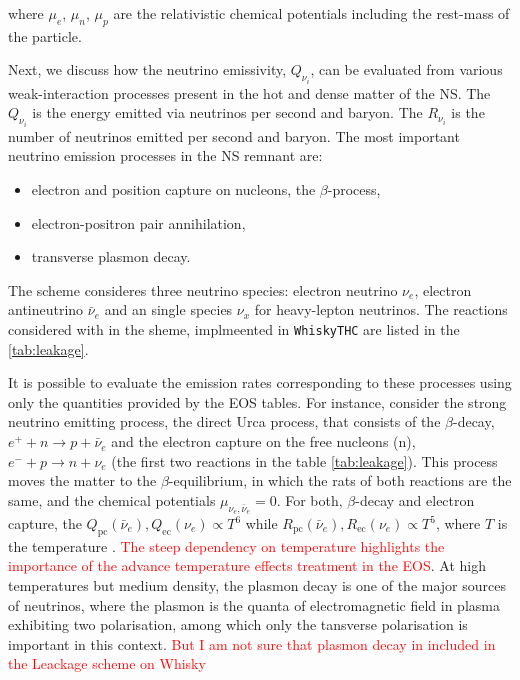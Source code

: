 \documentclass[11pt,a4paper,headinclude=true,DIV=14,BCOR=8mm,chapterprefix,listof=totoc,twoside,openright,abstracton]{scrbook}
\newcommand{\red}[1]{\textcolor{red}{#1}}
\begin{document}
where $\mu_e$, $\mu_n$, $\mu_p$ are the relativistic chemical potentials including the rest-mass of the particle. 

Next, we discuss how the neutrino emissivity, $Q_{\nu_{i}}$, can be evaluated from various weak-interaction processes present in the hot and dense matter of the NS. 
The $Q_{\nu_{i}}$ is the energy emitted via neutrinos per second and baryon.
The $R_{\nu_{i}}$ is the number of neutrinos emitted per second and baryon.
The most important neutrino emission processes in the NS remnant are: 
\begin{itemize}
    \item electron and position capture on nucleons, the $\beta$-process,
    \item electron-positron pair annihilation, 
    \item transverse plasmon decay.
\end{itemize}
The scheme consideres three neutrino species: electron neutrino $\nu_e$, electron antineutrino $\bar{\nu}_e$ and an single species $\nu_x$ for heavy-lepton neutrinos.
The reactions considered with in the sheme, implmeented in \texttt{WhiskyTHC} are  listed in the \ref{tab:leakage}.

It is possible to evaluate the emission rates corresponding to these processes using only the quantities provided by the EOS tables.
For instance, consider the strong neutrino emitting process, the direct Urca process, that consists of the $\beta$-decay, $e^+ + n \rightarrow p + \bar{\nu}_e$ and the electron capture on the free nucleons (n), $e^{-} + p \rightarrow n + \nu_e$ (the first two reactions in the table \ref{tab:leakage}). 
This process moves the matter to the $\beta$-equilibrium, in which the rats of both reactions are the same, and the chemical potentials $\mu_{\nu_e,\bar{\nu}_e}=0$.
For both, $\beta$-decay and electron capture, the $Q_{\text{pc}}(\bar{\nu}_e),Q_{\text{ec}}({\nu_e}) \propto T^{6}$ while $R_{\text{pc}}(\bar{\nu}_e),R_{\text{ec}}(\nu_e)\propto T^5$, where $T$ is the temperature \cite{Bruenn:1985}.
\red{The steep dependency on temperature highlights the importance of the advance temperature effects treatment in the EOS}.
At high temperatures but medium density, the plasmon decay is one of the major sources of neutrinos, where the plasmon is the quanta of electromagnetic field in plasma exhibiting two polarisation, among which only the tansverse polarisation is important in this context.
\cite{P. J. Schinder, D. N. Schramm, P. J.Wiita, S. H. Margolis, and D. L. Tubbs, Astrophys. J. 313, 531 (1987).} 
\red{But I am not sure that plasmon decay in included in the Leackage scheme on Whisky}
\end{document}
